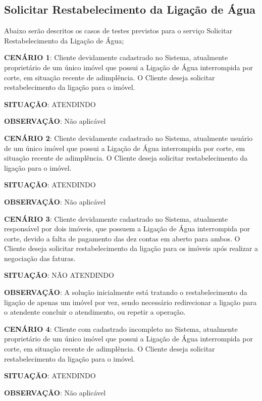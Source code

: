 \subsection{Solicitar Restabelecimento da Ligação de Água}
Abaixo serão descritos os casos de testes previstos para o serviço Solicitar Restabelecimento da Ligação de Água;
\begin{flushleft}
\begin{description}
	\item \textbf{CENÁRIO 1}: Cliente devidamente cadastrado no Sistema, atualmente proprietário de um único imóvel que possui a Ligação de Água interrompida por corte, em situação recente de adimplência. O Cliente deseja solicitar restabelecimento da ligação para o imóvel.
	\item \textbf{SITUAÇÃO}: ATENDINDO
	\item \textbf{OBSERVAÇÃO}: Não aplicável
\end{description}
\begin{description}
	\item \textbf{CENÁRIO 2}: Cliente devidamente cadastrado no Sistema, atualmente usuário de um único imóvel que possui a Ligação de Água interrompida por corte, em situação recente de adimplência. O Cliente deseja solicitar restabelecimento da ligação para o imóvel.
	\item \textbf{SITUAÇÃO}: ATENDINDO
	\item \textbf{OBSERVAÇÃO}: Não aplicável
\end{description}
\begin{description}
	\item \textbf{CENÁRIO 3}: Cliente devidamente cadastrado no Sistema, atualmente responsável por dois imóveis, que possuem a Ligação de Água interrompida por corte, devido a falta de pagamento das dez contas em aberto para ambos. O Cliente deseja solicitar restabelecimento da ligação para os imóveis após realizar a negociação das faturas.
	\item \textbf{SITUAÇÃO}: NÃO ATENDINDO
	\item \textbf{OBSERVAÇÃO}: A solução inicialmente está tratando o restabelecimento da ligação de apenas um imóvel por vez, sendo necessário redirecionar a ligação para o atendente concluir o atendimento, ou repetir a operação.
\end{description}

\begin{description}
	\item \textbf{CENÁRIO 4}: Cliente com cadastrado incompleto no Sistema, atualmente proprietário de um único imóvel que possui a Ligação de Água interrompida por corte, em situação recente de adimplência. O Cliente deseja solicitar restabelecimento da ligação para o imóvel.
	\item \textbf{SITUAÇÃO}: ATENDINDO
	\item \textbf{OBSERVAÇÃO}: Não aplicável	
\end{description}
\end{flushleft}	

